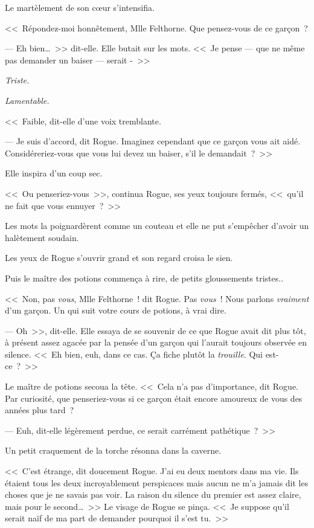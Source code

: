 Le martèlement de son cœur s'intensifia.

<<~Répondez-moi honnêtement, Mlle Felthorne. Que pensez-vous de ce garçon~?

--- Eh bien…~>> dit-elle. Elle butait sur les mots. <<~Je pense — que ne même pas demander un baiser — serait -~>>

\emph{Triste.}

\emph{Lamentable.}

<<~Faible, dit-elle d'une voix tremblante.

--- Je suis d'accord, dit Rogue. Imaginez cependant que ce garçon vous ait aidé. Considéreriez-vous que vous lui devez un baiser, s'il le demandait~?~>>

Elle inspira d'un coup sec.

<<~Ou penseriez-vous~>>, continua Rogue, ses yeux toujours fermés, <<~qu'il ne fait que vous ennuyer~?~>>

Les mots la poignardèrent comme un couteau et elle ne put s'empêcher d'avoir un halètement soudain.

Les yeux de Rogue s'ouvrir grand et son regard croisa le sien.

Puis le maître des potions commença à rire, de petits gloussements tristes..

<<~Non, pas \emph{vous}, Mlle Felthorne~! dit Rogue. Pas \emph{vous}~! Nous parlons \emph{vraiment} d'un garçon. Un qui suit votre cours de potions, à vrai dire.

--- Oh~>>, dit-elle. Elle essaya de se souvenir de ce que Rogue avait dit plus tôt, à présent assez agacée par la pensée d'un garçon qui l'aurait toujours observée en silence. <<~Eh bien, euh, dans ce cas. Ça fiche plutôt la \emph{trouille}. Qui est-ce~?~>>

Le maître de potions secoua la tête. <<~Cela n'a pas d'importance, dit Rogue. Par curiosité, que penseriez-vous si ce garçon était encore amoureux de vous des années plus tard~?

--- Euh, dit-elle légèrement perdue, ce serait carrément pathétique~?~>>

Un petit craquement de la torche résonna dans la caverne.

<<~C'est étrange, dit doucement Rogue. J'ai eu deux mentors dans ma vie. Ils étaient tous les deux incroyablement perspicaces mais aucun ne m'a jamais dit les choses que je ne savais pas voir. La raison du silence du premier est assez claire, mais pour le second…~>> Le visage de Rogue se pinça. <<~Je suppose qu'il serait naïf de ma part de demander pourquoi il s'est tu.~>>

